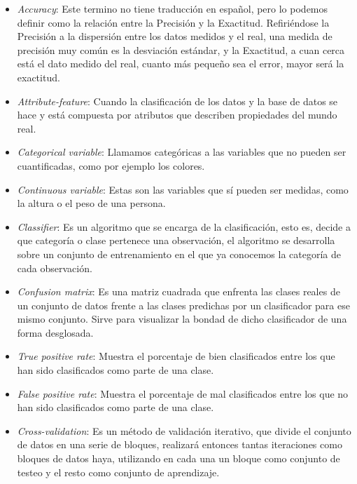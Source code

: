 \documentclass[es]{ifirak}
\begin{document}
\begin{itemize}

\item \emph{Accuracy}: Este termino no tiene traducción en español, pero lo podemos definir como la relación entre la Precisión y la Exactitud. Refiriéndose la Precisión a la dispersión entre los datos medidos y el real, una medida de precisión muy común es la desviación estándar, y la Exactitud, a cuan cerca está el dato medido del real, cuanto más pequeño sea el error, mayor será la exactitud. 

\item \emph{Attribute-feature}: Cuando la clasificación de los datos y la base de datos se hace y está compuesta por atributos que describen propiedades del mundo real.

\item \emph{Categorical variable}: Llamamos categóricas a las variables que no pueden ser cuantificadas, como por ejemplo los colores. 

\item \emph{Continuous variable}: Estas son las variables que sí pueden ser medidas, como la altura o el peso de una persona.

\item \emph{Classifier}: Es un algoritmo que se encarga de la clasificación, esto es, decide a que  categoría o clase pertenece una observación, el algoritmo se desarrolla sobre un conjunto de entrenamiento en el que ya conocemos la categoría de cada observación.

\item \emph{Confusion matrix}: Es una matriz cuadrada que enfrenta las clases reales de un conjunto de datos frente a las clases predichas por un clasificador para ese mismo conjunto. Sirve para visualizar la bondad de dicho clasificador de una forma desglosada. 

\item \emph{True positive rate}: Muestra el porcentaje de bien clasificados entre los que han sido clasificados como parte de una clase.

\item \emph{False positive rate}: Muestra el porcentaje de mal clasificados entre los que no han sido clasificados como parte de una clase.

\item \emph{Cross-validation}: Es un método de validación iterativo, que divide el conjunto de datos en una serie de bloques, realizará entonces tantas iteraciones como bloques de datos haya, utilizando en cada una un bloque como conjunto de testeo y el resto como conjunto de aprendizaje. 


\end{itemize}
\end{document}
